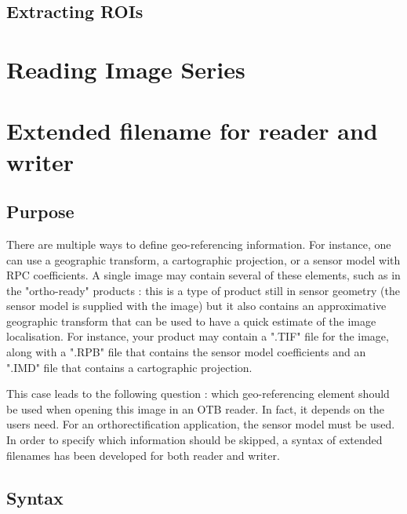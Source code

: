 \subsection{Extracting ROIs}
\label{sec:ExtractROI}



%

\section{Reading Image Series}
\label{sec:ReadingImageSeries}



\section{Extended filename for reader and writer}
\label{sec:ExtendedFilename}

\subsection{Purpose}

There are multiple ways to define geo-referencing information. For instance,
 one can use a geographic transform, a cartographic projection, or a sensor 
model with RPC coefficients. A single image may contain several of these 
elements, such as in the "ortho-ready" products : this is a type of product 
still in sensor geometry (the sensor model is supplied with the image) 
but it also contains an approximative geographic transform that can be used 
to have a quick estimate of the image localisation. For instance, your product
may contain a ".TIF" file for the image, along with a ".RPB" file that contains
the sensor model coefficients and an ".IMD" file that contains a cartographic 
projection. 

This case leads to the following question : which geo-referencing element
should be used when opening this image in an OTB reader. In fact, it depends on
the users need. For an orthorectification application, the sensor model must be
used. In order to specify which information should be skipped, a syntax of 
extended filenames has been developed for both reader and writer. 


\subsection{Syntax}

